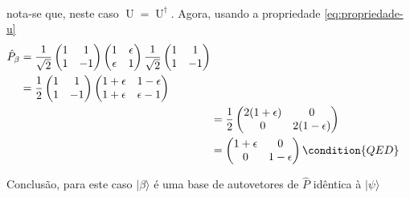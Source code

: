 \begin{prob}
\begin{sol}
\begin{enumerate}[label=\alph *)]
\begin{align}
						\end{align}
						nota-se que, neste caso $\mathop{U}=\mathop{U}^{\dag}$. Agora, usando a propriedade \ref{eq:propriedade-u}
						\begin{align}
							\begin{split}
								\hat{P}_{\beta} &= \frac{1}{\sqrt{2}}
								\begin{pmatrix}
									1 & 1 \\
									1 & -1
								\end{pmatrix}
								\begin{pmatrix}
									1 & \epsilon \\
									\epsilon & 1
								\end{pmatrix}\frac{1}{\sqrt{2}}
								\begin{pmatrix}
									1 & 1 \\
									1 & -1
								\end{pmatrix}\\
																&= \frac{1}{2}
								\begin{pmatrix}
									1 & 1 \\
									1 & -1
								\end{pmatrix}
								\begin{pmatrix}
									1+\epsilon & 1-\epsilon \\
									1+\epsilon & \epsilon-1
								\end{pmatrix}
							\end{split}\\&=\frac{1}{2}
							\begin{pmatrix}
								2(1+\epsilon) & 0 \\
								0 & 2(1-\epsilon)
							\end{pmatrix}\\&=
							\begin{pmatrix}
								1+\epsilon & 0\\
								0 & 1-\epsilon
							\end{pmatrix}\condition{QED}
						\end{align}
			 \end{enumerate}
			 Conclusão, para este caso $|{\beta}\rangle$ é uma base de autovetores de $\hat{P}$ idêntica à $|{\psi}\rangle$
		 \end{sol}
	 \end{prob}
